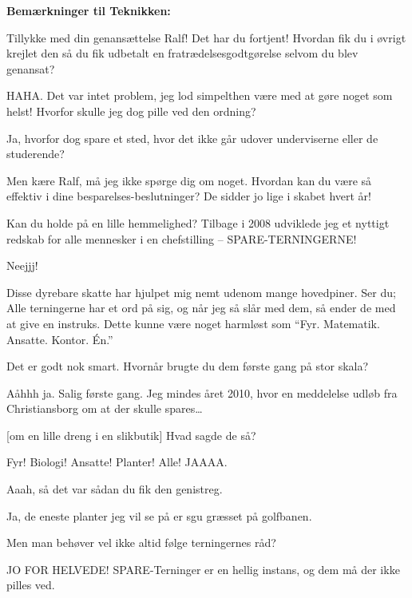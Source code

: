\documentclass[a4paper,12pt]{article}
\begin{document}
\begin{sketch}


\textbf{Bemærkninger til Teknikken:}

 Tillykke med din genansættelse Ralf! Det har du fortjent! Hvordan fik du i øvrigt krejlet den så du fik udbetalt en fratrædelsesgodtgørelse selvom du blev genansat?

 HAHA. Det var intet problem, jeg lod simpelthen være med at gøre noget som helst! Hvorfor skulle jeg dog pille ved den ordning?

 Ja, hvorfor dog spare et sted, hvor det ikke går udover underviserne eller de studerende?


 Men kære Ralf, må jeg ikke spørge dig om noget. Hvordan kan du være så effektiv i dine besparelses-beslutninger? De sidder jo lige i skabet hvert år!

 Kan du holde på en lille hemmelighed? Tilbage i 2008 udviklede jeg et nyttigt redskab for alle mennesker i en chefstilling -- SPARE-TERNINGERNE!

 Neejjj! 

 Disse dyrebare skatte har hjulpet mig nemt udenom mange hovedpiner. Ser du; Alle terningerne har et ord på sig, og når jeg så slår med dem, så ender de med at give en instruks. Dette kunne være noget harmløst som ``Fyr. Matematik. Ansatte. Kontor. Én.''

 Det er godt nok smart. Hvornår brugte du dem første gang på stor skala?

 Aåhhh ja. Salig første gang. Jeg mindes året 2010, hvor en meddelelse udløb fra Christiansborg om at der skulle spares\ldots


[om en lille dreng i en slikbutik] Hvad sagde de så?

Fyr! Biologi! Ansatte! Planter! Alle! JAAAA.

 Aaah, så det var sådan du fik den genistreg.

 Ja, de eneste planter jeg vil se på er sgu græsset på golfbanen.

 Men man behøver vel ikke altid følge terningernes råd?

 JO FOR HELVEDE! SPARE-Terninger er en hellig instans, og dem må der ikke pilles ved.


\end{sketch}
\end{document}
